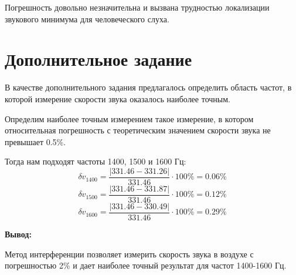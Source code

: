 \documentclass[12pt]{article}
\newcommand\field[1]{\noindent\textbf{#1}\ }
\begin{document}
Погрешность довольно незначительна и вызвана трудностью локализации звукового минимума для человеческого слуха. 
\section*{Дополнительное задание} 
В качестве дополнительного задания предлагалось определить область частот, в которой измерение скорости звука оказалось наиболее точным. \par
Определим наиболее точным измерением такое измерение, в котором относительная погрешность с теоретическим значением скорости звука не превышает 0.5\%. \par
Тогда нам подходят частоты 1400, 1500 и 1600 Гц:
\begin{equation}
    \delta v_{1400} = \frac{|331.46-331.26|}{331.46} \cdot 100\% = 0.06\% 
\end{equation}
\begin{equation}
    \delta v_{1500} = \frac{|331.46-331.87|}{331.46} \cdot 100\% = 0.12\% 
\end{equation}
\begin{equation}
    \delta v_{1600} = \frac{|331.46-330.49|}{331.46} \cdot 100\% = 0.29\% 
\end{equation}

\field{Вывод: }

Метод интерференции позволяет измерить скорость звука в воздухе с погрешностью 2\% и дает наиболее точный результат для частот 1400-1600 Гц.
\end{document}
